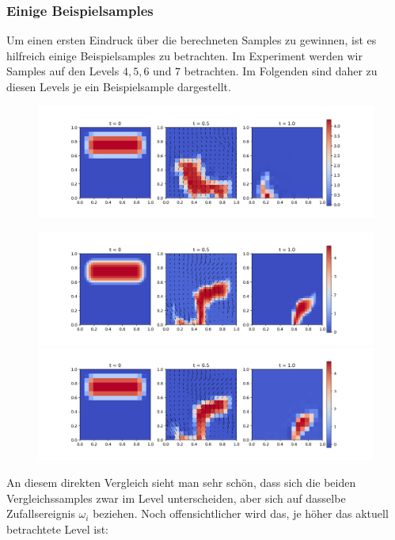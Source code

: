 \subsubsection{Einige Beispielsamples}
Um einen ersten Eindruck über die berechneten Samples zu gewinnen, ist es hilfreich einige Beispielsamples zu betrachten. Im Experiment werden wir Samples auf den Levels $ 4,5,6 $ und $ 7 $ betrachten. Im Folgenden sind daher zu diesen Levels je ein Beispielsample dargestellt.
\begin{figure}[H]
	\centering
	\includegraphics[width=\textwidth]{plots/sample_4_1.png} 
\end{figure}
\begin{figure}[H]
	\centering
	\includegraphics[width=\textwidth]{plots/sample_5_1.png} 
	\includegraphics[width=\textwidth]{plots/sample_coarse_5_1.png} 
\end{figure}
An diesem direkten Vergleich sieht man sehr schön, dass sich die beiden Vergleichssamples zwar im Level unterscheiden, aber sich auf dasselbe Zufallsereignis $ \omega_i $ beziehen. Noch offensichtlicher wird das, je höher das aktuell betrachtete Level ist:

